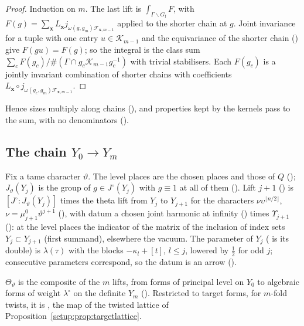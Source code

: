 \begin{proof}
Induction on $m$. The last lift is $\int_{\Gamma\backslash G_{\mathrm f}}F$, with $F(g)=\sum_{\mathbf x}L_{\mathbf x}
j_{\omega(g,g_m)\mathcal F_{\mathbf x,m-1}}$ applied to the shorter chain at $g$. Joint invariance for a tuple
with one entry $u\in \mathcal K_{m-1}$ and the equivariance of the shorter chain
() give $F(gu)=F(g)$; so the integral is the class sum
$\sum_cF(g_c)/\#(\Gamma\cap g_c\mathcal K_{m-1}g_c^{-1})$ with trivial stabilisers. Each $F(g_c)$ is a
jointly invariant combination of shorter chains with coefficients
$L_{\mathbf x}\circ j_{\omega(g_c,g_m)\mathcal F_{\mathbf x,m-1}}$.
\end{proof}

Hence sizes multiply along chains (), and properties kept
by the kernels pass to the sum, with no denominators ().

\subsection{The chain $Y_0\to Y_m$}\label{ub-objects:sec:lower}

Fix a tame character $\vartheta$. The level places are the chosen places and those of $Q$
(); $J_\vartheta(Y_j)$ is the group of $g\in J^\circ(Y_j)$ with
$g\equiv1$ at all of them (). Lift $j+1$ () is
$[J^\circ:J_\vartheta(Y_j)]$ times the theta lift from $Y_j$ to $Y_{j+1}$ for the characters
$\nu\upsilon^{\lfloor n/2\rfloor}$, $\nu=\mu^0_{j+1}\vartheta^{j+1}$ (),
with datum a chosen joint harmonic at infinity () times $\Upsilon_{j+1}$
(): at the level places the indicator of the matrix of the inclusion of
index sets $Y_j\subset Y_{j+1}$ (first summand), elsewhere the vacuum. The parameter of $Y_j$ ( is its double) is $\lambda(\tau)$
with the blocks $-\kappa_l+[t]$, $l\le j$, lowered by $\frac12$ for odd $j$; consecutive
parameters correspond, so the datum is an arrow ().

\begin{definition}\label{ub-objects:def:lowerchain}
$\Theta_\vartheta$ is the composite of the $m$ lifts, from forms of principal level on $Y_0$ to
algebraic forms of weight $\lambda^\circ$ on the definite $Y_m$ ().
Restricted to target forms, for $m$-fold twists, it is , the map of the twisted
lattice of Proposition~\ref{setup:prop:targetlattice}.
\end{definition}

